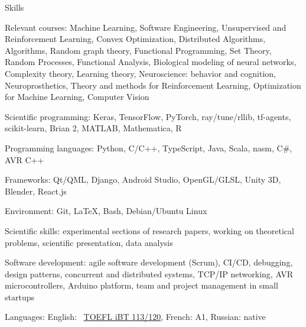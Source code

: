 \documentclass{resume} %
\newcommand*{\img}[1]{%
	\raisebox{-.02\baselineskip}{%
		\texttt{[image: \#1]}%
	}%
}
\newcommand*{\emoji}[1]{\img{./emoji/\imgpref#1.png}}
\newcommand*{\mybold}[1]{{\color{pinkunderline} #1}}
\newcommand*{\myboldq}[1]{{#1}}
\def\imgpref{bleak-}
\newcommand{\mylink}{{\color{gray}\faExternalLink}}
\begin{document}
\vspace{-2em}
\begin{rSection}{Skills}
	\vspace{-1em}
	\item \myboldq{Relevant courses:} \mybold{Machine Learning, Software Engineering,} {\small Unsupervised and Reinforcement Learning, Convex Optimization, Distributed Algorithms, Algorithms, Random graph theory, Functional Programming, Set Theory, Random Processes, Functional Analysis, Biological modeling of neural networks, Complexity theory, Learning theory, Neuroscience: behavior and cognition, Neuroprosthetics, Theory and methods for Reinforcement Learning, Optimization for Machine Learning, Computer Vision}
	\item \myboldq{Scientific programming:} \mybold{Keras, TensorFlow, PyTorch,} ray/tune/rllib, tf-agents, scikit-learn, Brian 2, MATLAB, Mathematica, R
	\item \myboldq{Programming languages:} \mybold{Python, C/C++}, TypeScript, Java, {\small Scala, nasm, C\#, AVR C++}
	\item \myboldq{Frameworks:} Qt/QML, Django, {\small Android Studio, OpenGL/GLSL, Unity 3D, Blender, React.js}
	\item \myboldq{Environment:} \mybold{Git, \LaTeX, Bash, Debian/Ubuntu Linux}
	\item \myboldq{Scientific skills:} \mybold{experimental} sections of research papers, working on \mybold{theoretical} problems, scientific presentation, data analysis
	\item \myboldq{Software development:} \mybold{agile} software development (Scrum), CI/CD, debugging, design patterns, concurrent and distributed systems, {\small TCP/IP networking, AVR microcontrollers, Arduino platform, team and project management in \mybold{small startups}}
	\item \myboldq{Languages:} \emoji{flag-us} English: \mylink~\href{https://sergia-ch.github.io/epfl/TOEFL.pdf}{TOEFL iBT \mybold{113}/120}, {\small \emoji{flag-fr} French: A1, \emoji{flag-ru} Russian: native}
\end{rSection}
\end{document}
